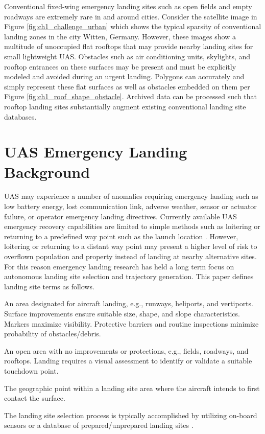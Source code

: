 Conventional fixed-wing emergency landing sites such as open fields and empty roadways are extremely rare in and around cities. Consider the satellite image in Figure \ref{fig:ch1_challenge_urban} which shows the typical sparsity of conventional landing zones in the city Witten, Germany. However, these images show a multitude of unoccupied flat rooftops that may provide nearby landing sites for small lightweight UAS. Obstacles such as air conditioning units, skylights, and rooftop entrances on these surfaces may be present and must be explicitly modeled and avoided during an urgent landing. Polygons can accurately and simply represent these flat surfaces as well as obstacles embedded on them per Figure \ref{fig:ch1_roof_shape_obstacle}. Archived data can be processed such that rooftop landing sites substantially augment existing conventional landing site databases.




\section{UAS Emergency Landing Background}



\ac{UAS} may experience a number of anomalies requiring emergency landing such as low battery energy, lost communication link, adverse weather, sensor or actuator failure, or operator emergency landing directives. Currently available \ac{UAS} emergency recovery capabilities are limited to simple methods such as loitering or returning to a predefined way point such as the launch location \cite{Stansbury2015, mejias_alvarez_forced_2009}. However, loitering or returning to a distant way point may present a higher level of risk to overflown population and property instead of landing at nearby alternative sites. For this reason emergency landing research has held a long term focus on autonomous landing site selection and trajectory generation. This paper defines landing site terms as follows. 
\begin{definition}
An area designated for aircraft landing, e.g., runways, heliports, and vertiports. Surface improvements ensure suitable size, shape, and slope characteristics.  Markers maximize visibility. Protective barriers and routine inspections minimize probability of obstacles/debris.
\end{definition}
\begin{definition}
An open area with no improvements or protections, e.g., fields, roadways, and rooftops. Landing requires a visual assessment to identify or validate a suitable touchdown point.
\end{definition}
\begin{definition}
The geographic point within a landing site area where the aircraft intends to first contact the surface.
\end{definition}
The landing site selection process is typically accomplished by utilizing on-board sensors or a database of prepared/unprepared landing sites \cite{warren_enabling_2015, ten_harmsel_emergency_2017}.
